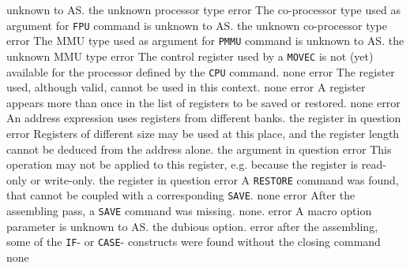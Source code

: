 \documentclass[12pt,twoside]{report}
\newcommand{\tty}[1]{{\tt #1}}
\newcommand{\asname}{{AS}}
\begin{document}
\begin{description}
{                unknown to \asname{}.}
               {the unknown processor type}
               {error}
               {The co-processor type used as argument for \tty{FPU} command is
                unknown to \asname{}.}
               {the unknown co-processor type}
               {error}
               {The MMU type used as argument for \tty{PMMU} command is
                unknown to \asname{}.}
               {the unknown MMU type}
               {error}
               {The control register used by a \tty{MOVEC} is not (yet) available
                for the processor defined by the \tty{CPU} command.}
               {none}
               {error}
               {The register used, although valid, cannot be used in this
                context.}
               {none}
               {error}
               {A register appears more than once in the list of registers
                to be saved or restored.}
               {none}
               {error}
               {An address expression uses registers from different banks.}
               {the register in question}
               {error}
               {Registers of different size may be used at this place, and
                 the register length cannot be deduced from the address alone.}
               {the argument in question}
               {error}
               {This operation may not be applied to this register, e.g. because
                the register is read-only or write-only.}
               {the register in question}
               {error}
               {A \tty{RESTORE} command was found, that cannot be coupled with a
                corresponding \tty{SAVE}.}
               {none}
               {error}
               {After the assembling pass, a \tty{SAVE} command was missing.}
               {none.}
               {error}
               {A macro option parameter is unknown to \asname{}.}
               {the dubious option.}
               {error}
               {after the assembling, some of the \tty{IF}- or \tty{CASE}- constructs
                were found without the closing command}
               {none}

\end{description}
\end{document}
